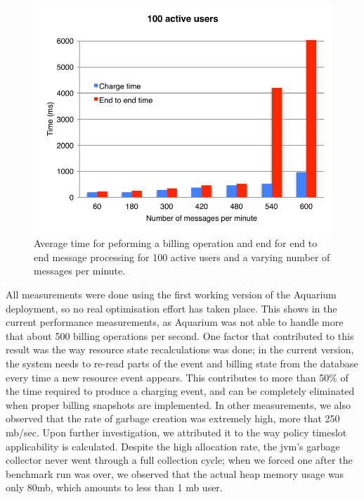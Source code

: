 \documentclass[preprint,10pt]{sigplanconf}
\begin{document}
\begin{figure}[t]
    \begin{center}
        \includegraphics[scale=0.63]{perf.pdf}
    \end{center}

    \caption{Average time for peforming a billing operation and end for end to
    end message processing for 100 active users and a varying number of
    messages per minute.}
    
    \label{fig:perf}
\end{figure}

All measurements were done using the first working version of the Aquarium
deployment, so no real optimisation effort has taken place. This shows in the
current performance measurements, as Aquarium was not able to handle more that
about 500 billing operations per second. One factor that contributed to this
result was the way resource state recalculations was done; in the current
version, the system needs to re-read parts of the event and billing state from
the database every time a new resource event appears. This contributes to more
than 50\% of the time required to produce a charging event, and can be
completely eliminated when proper billing snapshots are implemented. In other
measurements, we also observed that the rate of garbage creation was extremely
high, more that 250 {\sc mb/sec}. Upon further investigation, we attributed it
to the way policy timeslot applicability is calculated. Despite the high
allocation rate, the {\sc jvm}'s garbage collector never went through a
full collection cycle; when we forced one after the benchmark run was over, 
we observed that the actual heap memory usage was only 80{\sc mb}, which
amounts to less than 1 {\sc mb} user.
\end{document}
